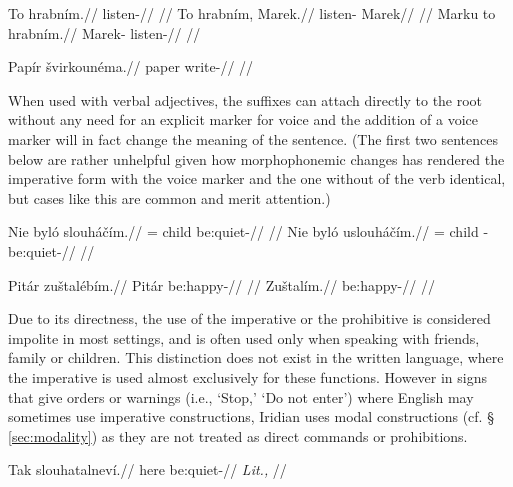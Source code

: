 \pex
\begingl
    \gla To hrabním.//
    \glb \Dem{} listen-//
    \glft {}//
\endgl
\xe
\pex
\a
\begingl
    \gla To hrabním, Marek.//
    \glb \Dem{} listen- Marek//
    \glft {}//
\endgl
\a
\begingl
    \gla Marku to hrabním.//
    \glb Marek- \Dem{} listen-//
    \glft {}//
\endgl
\xe

\pex
\begingl
    \gla Papír švirkounéma.//
    \glb paper write-//
    \glft {}//
\endgl
\xe

When used with verbal adjectives, the suffixes can attach directly to the root
without any need for an explicit marker for voice and the addition of a voice
marker will in fact change the meaning of the sentence. (The first two sentences
below are rather unhelpful given how morphophonemic changes has rendered the
imperative form with the voice marker and the one without of the verb
 identical, but cases like this are common and merit
attention.)

\pex
\a
\begingl
    \gla Nie byló slouháčím.//
    \glb \Pl{}= child be:quiet-//
    \glft {}//
\endgl
\a
\begingl
    \gla Nie byló uslouháčím.//
    \glb \Pl{}= child \Refl{}-be:quiet-//
    \glft {}//
\endgl
\xe

\pex
\a
\begingl
    \gla Pitár zuštalébím.//
    \glb Pitár be:happy-//
    \glft {}//
\endgl
\a
\begingl
    \gla Zuštalím.//
    \glb be:happy-//
    \glft {}//
\endgl
\xe


Due to its directness, the use of the imperative or the prohibitive is
considered impolite in most settings, and is often used only when speaking with
friends, family or children. This distinction does not exist in the written
language, where the imperative is used almost exclusively for these functions.
However in signs that give orders or warnings (i.e., `Stop,' `Do not enter')
where English may sometimes use imperative constructions, Iridian
uses modal constructions (cf. \S\,\ref{sec:modality}) as they
are not treated as direct commands or prohibitions.

\pex
\begingl
    \gla Tak slouhatalneví.//
    \glb here be:quiet-//
    \glft {} \textit{Lit.,} //
\endgl
\xe

